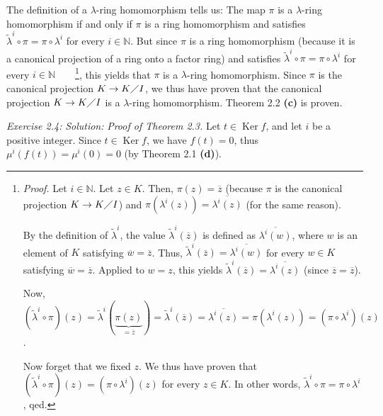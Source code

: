 \documentclass[numbers=enddot,12pt,final,onecolumn,notitlepage]{scrartcl}%
\begin{document}
The definition of a $\lambda$-ring homomorphism tells us: The map $\pi$ is a
$\lambda$-ring homomorphism if and only if $\pi$ is a ring homomorphism and
satisfies $\widetilde{\lambda}^{i}\circ\pi=\pi\circ\lambda^{i}$ for every
$i\in\mathbb{N}$. But since $\pi$ is a ring homomorphism (because it is a
canonical projection of a ring onto a factor ring) and satisfies
$\widetilde{\lambda}^{i}\circ\pi=\pi\circ\lambda^{i}$ for every $i\in
\mathbb{N}$\ \ \ \ \footnote{\textit{Proof.} Let $i\in\mathbb{N}$. Let $z\in
K$. Then, $\pi\left(  z\right)  =\overline{z}$ (because $\pi$ is the canonical
projection $K\rightarrow K\diagup I$) and $\pi\left(  \lambda^{i}\left(
z\right)  \right)  =\overline{\lambda^{i}\left(  z\right)  }$ (for the same
reason).
\par
By the definition of $\widetilde{\lambda}^{i}$, the value $\widetilde{\lambda
}^{i}\left(  \overline{z}\right)  $ is defined as $\overline{\lambda
^{i}\left(  w\right)  }$, where $w$ is an element of $K$ satisfying
$\overline{w}=\overline{z}$. Thus, $\widetilde{\lambda}^{i}\left(
\overline{z}\right)  =\overline{\lambda^{i}\left(  w\right)  }$ for every
$w\in K$ satisfying $\overline{w}=\overline{z}$. Applied to $w=z$, this yields
$\widetilde{\lambda}^{i}\left(  \overline{z}\right)  =\overline{\lambda
^{i}\left(  z\right)  }$ (since $\overline{z}=\overline{z}$).
\par
Now, $\left(  \widetilde{\lambda}^{i}\circ\pi\right)  \left(  z\right)
=\widetilde{\lambda}^{i}\left(  \underbrace{\pi\left(  z\right)  }%
_{=\overline{z}}\right)  =\widetilde{\lambda}^{i}\left(  \overline{z}\right)
=\overline{\lambda^{i}\left(  z\right)  }=\pi\left(  \lambda^{i}\left(
z\right)  \right)  =\left(  \pi\circ\lambda^{i}\right)  \left(  z\right)  $.
\par
Now forget that we fixed $z$. We thus have proven that $\left(
\widetilde{\lambda}^{i}\circ\pi\right)  \left(  z\right)  =\left(  \pi
\circ\lambda^{i}\right)  \left(  z\right)  $ for every $z\in K$. In other
words, $\widetilde{\lambda}^{i}\circ\pi=\pi\circ\lambda^{i}$, qed.}, this
yields that $\pi$ is a $\lambda$-ring homomorphism. Since $\pi$ is the
canonical projection $K\rightarrow K\diagup I$, we thus have proven that the
canonical projection $K\rightarrow K\diagup I$ is a $\lambda$-ring
homomorphism. Theorem 2.2 \textbf{(c)} is proven.

\textit{Exercise 2.4:} \textit{Solution:} \textit{Proof of Theorem 2.3.} Let
$t\in\operatorname*{Ker}f$, and let $i$ be a positive integer. Since
$t\in\operatorname*{Ker}f$, we have $f\left(  t\right)  =0$, thus $\mu
^{i}\left(  f\left(  t\right)  \right)  =\mu^{i}\left(  0\right)  =0$ (by
Theorem 2.1 \textbf{(d)}).
\end{document}
